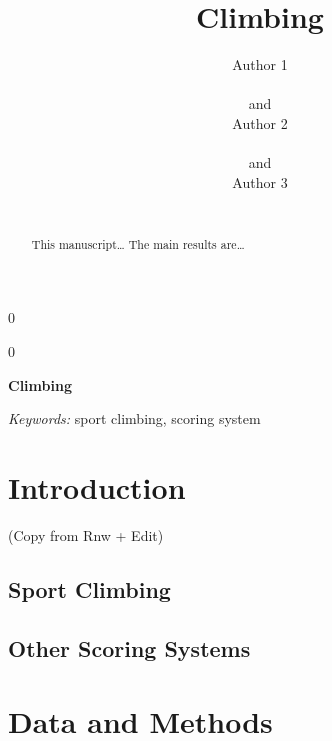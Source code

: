 \documentclass[12pt]{article}
\newcommand{\blind}{0}
\begin{document}
\def\spacingset#1{\renewcommand{\baselinestretch}%
{#1}\small\normalsize} \spacingset{1}



\blind
{
  \title{\bf Climbing}

  \author{
        Author 1 \\
    \\
     and \\     Author 2 \\
    \\
     and \\     Author 3 \\
    \\
      }
  \maketitle
} \fi

\blind
{
  \bigskip
  \bigskip
  \bigskip
  \begin{center}
    {\LARGE\bf Climbing}
  \end{center}
  \medskip
} \fi

\bigskip
\begin{abstract}
This manuscript\ldots{} The main results are\ldots{}
\end{abstract}

\noindent%
{\it Keywords:} sport climbing, scoring system
\vfill

\newpage
\spacingset{1.45} %

\hypertarget{introduction}{%
\section{Introduction}\label{introduction}}

(Copy from Rnw + Edit)

\hypertarget{sport-climbing}{%
\subsection{Sport Climbing}\label{sport-climbing}}

\hypertarget{other-scoring-systems}{%
\subsection{Other Scoring Systems}\label{other-scoring-systems}}

\hypertarget{data-and-methods}{%
\section{Data and Methods}\label{data-and-methods}}
\end{document}
